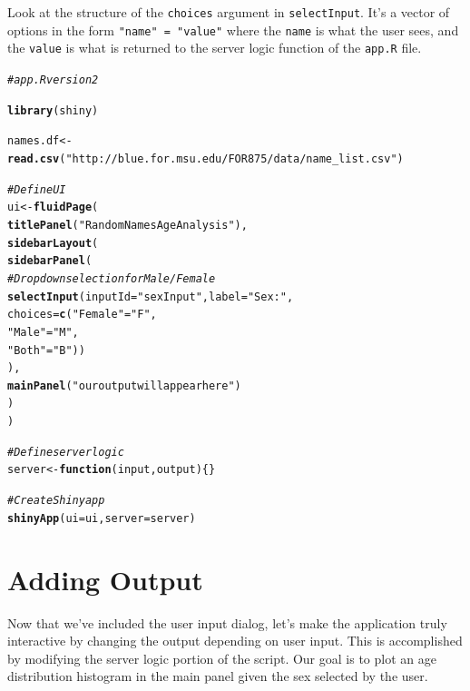 \documentclass[12pt,oneside]{book}\usepackage[]{graphicx}\usepackage[]{color}
\makeatletter
\newcommand{\hlstr}[1]{\textcolor[rgb]{0.192,0.494,0.8}{#1}}%
\newcommand{\hlcom}[1]{\textcolor[rgb]{0.678,0.584,0.686}{\textit{#1}}}%
\newcommand{\hlstd}[1]{\textcolor[rgb]{0.345,0.345,0.345}{#1}}%
\newcommand{\hlkwa}[1]{\textcolor[rgb]{0.161,0.373,0.58}{\textbf{#1}}}%
\newcommand{\hlkwb}[1]{\textcolor[rgb]{0.69,0.353,0.396}{#1}}%
\newcommand{\hlkwc}[1]{\textcolor[rgb]{0.333,0.667,0.333}{#1}}%
\newcommand{\hlkwd}[1]{\textcolor[rgb]{0.737,0.353,0.396}{\textbf{#1}}}%
\newenvironment{kframe}{%
 \def\at@end@of@kframe{}%
 \ifinner\ifhmode%
  \def\at@end@of@kframe{\end{minipage}}%
  \begin{minipage}{\columnwidth}%
 \fi\fi%
 \def\FrameCommand##1{\hskip\@totalleftmargin \hskip-\fboxsep
 \colorbox{shadecolor}{##1}\hskip-\fboxsep
     \hskip-\linewidth \hskip-\@totalleftmargin \hskip\columnwidth}%
 \MakeFramed {\advance\hsize-\width
   \@totalleftmargin\z@ \linewidth\hsize
   \@setminipage}}%
 {\par\unskip\endMakeFramed%
 \at@end@of@kframe}
\newenvironment{knitrout}{}{} %
\makeatother
\begin{document}
Look at the structure of the \verb+choices+ argument in \verb+selectInput+. It's a vector of options in the form \verb+"name" = "value"+ where the \verb+name+ is what the user sees, and the \verb+value+ is what is returned to the server logic function of the \verb+app.R+ file.

\begin{knitrout}
\color{fgcolor}\begin{kframe}
\begin{alltt}
\hlcom{# app.R version 2}

\hlkwd{library}\hlstd{(shiny)}

\hlstd{names.df} \hlkwb{<-} \hlkwd{read.csv}\hlstd{(}\hlstr{"http://blue.for.msu.edu/FOR875/data/name_list.csv"}\hlstd{)}

\hlcom{# Define UI}
\hlstd{ui} \hlkwb{<-} \hlkwd{fluidPage}\hlstd{(}
  \hlkwd{titlePanel}\hlstd{(}\hlstr{"Random Names Age Analysis"}\hlstd{),}
  \hlkwd{sidebarLayout}\hlstd{(}
    \hlkwd{sidebarPanel}\hlstd{(}
      \hlcom{# Dropdown selection for Male/Female}
      \hlkwd{selectInput}\hlstd{(}\hlkwc{inputId} \hlstd{=} \hlstr{"sexInput"}\hlstd{,} \hlkwc{label} \hlstd{=} \hlstr{"Sex:"}\hlstd{,}
                  \hlkwc{choices} \hlstd{=} \hlkwd{c}\hlstd{(}\hlstr{"Female"} \hlstd{=} \hlstr{"F"}\hlstd{,}
                              \hlstr{"Male"} \hlstd{=} \hlstr{"M"}\hlstd{,}
                              \hlstr{"Both"} \hlstd{=} \hlstr{"B"}\hlstd{))}
    \hlstd{),}
    \hlkwd{mainPanel}\hlstd{(}\hlstr{"our output will appear here"}\hlstd{)}
  \hlstd{)}
\hlstd{)}

\hlcom{# Define server logic}
\hlstd{server} \hlkwb{<-} \hlkwa{function}\hlstd{(}\hlkwc{input}\hlstd{,} \hlkwc{output}\hlstd{) \{\}}

\hlcom{# Create Shiny app}
\hlkwd{shinyApp}\hlstd{(}\hlkwc{ui} \hlstd{= ui,} \hlkwc{server} \hlstd{= server)}
\end{alltt}
\end{kframe}
\end{knitrout}


\section{Adding Output}

Now that we've included the user input dialog, let's make the application truly interactive by changing the output depending on user input. This is accomplished by modifying the server logic portion of the script. Our goal is to plot an age distribution histogram in the main panel given the sex selected by the user.
\end{document}
